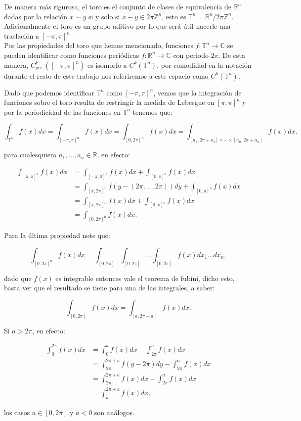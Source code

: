 \documentclass[12pt]{article}
\newcommand\R{\ensuremath{\mathbb{R}}}
\newcommand\T{\mathbb{T}}
\begin{document}
De manera más rigurosa, el toro es el conjunto de clases de equivalencia de $\mathbb{R}^n$ dadas por la relación $x \sim y$ si y solo si $x-y \in 2 \pi \mathbb{Z}^n$, esto es $\mathbb{T}^n=\mathbb{R}^n/ 2 \pi \mathbb{Z}^n$. Adicionalmente el toro es un grupo aditivo por lo que será útil hacerle una traslación a $[-\pi,\pi]^n$\\

Por las propiedades del toro que hemos mencionado, funciones $f: \mathbb{T}^n \rightarrow \mathbb{C}$ se pueden identificar como funciones periódicas $f: \mathbb{R}^n \rightarrow \mathbb{C}$ con periodo $2 \pi$. De esta manera, $C_{\text {per }}^k([-\pi, \pi]^n)$ es isomorfo a $C^k(\mathbb{T}^n)$, por comodidad en la notación durante el resto de  este trabajo nos referiremos a este espacio como $C^k(\T^n)$. \cite{ogrianoc}\\

\begin{note}
    Dado que  podemos identificar $\mathbb{T}^n$ como $[-\pi,\pi]^n$, vemos que la integración de funciones sobre el toro resulta de restringir la medida de Lebesgue en $[\pi,\pi]^n$ y por la periodicidad de las funciones en $\mathbb{T}^n$ tenemos que:

    $$\int_{\mathbb{T}^n} f(x) d x=\int_{[-\pi,\pi]^n} f(x) d x=\int_{[0,2\pi]^n} f(x) d x=\int_{\left[a_1, 2\pi+a_1\right] \times \cdots \times\left[a_n, 2\pi+a_n\right]} f(x) d x.$$


    para cualesquiera $a_1,\ldots,a_n \in \R$, en efecto:

    $$\begin{aligned}
    \int_{[\pi, \pi]^n} f(x) d x & =\int_{[-\pi, 0]^n} f(x) d x+\int_{[0, \pi]^n} f(x) d x \\
     & =\int_{[\pi, 2 \pi]^n} f(y-(2 \pi,\ldots,2\pi)) d y+\int_{[0, \pi]^n} f(x) d x \\
    & =\int_{[\pi, 2 \pi]^n} f(x) d x+\int_{[0, \pi]^n} f(x) d x\\
    &=\int_{[0,2\pi]^n} f(x) d x.
    \end{aligned}$$

Para la última propiedad note que:

$$\int_{[0,2\pi]^ n}f(x)dx=\int_{[0,2\pi]}\int_{[0,2\pi]}\ldots\int_{[0,2\pi]}f(x) dx_1\ldots dx_n,$$

dado que $f(x)$ es integrable entonces vale el teorema de fubini, dicho esto, basta ver que el resultado se tiene para una de las integrales, a saber:

$$\int_{[0,2\pi]}f(x)dx=\int_{[a,2\pi+a]}f(x)dx.$$

Si $a>2\pi$, en efecto:

\begin{align*}
    \int_0^{2\pi}f(x)dx&=\int_0^af(x)dx-\int_{2\pi}^af(x) dx\\
    &=\int_{2\pi}^{2\pi+a}f(y-2\pi)dy-\int_{2\pi}^af(x)dx\\
    &=\int_{2\pi}^{2\pi+a}f(x)dx-\int_{2\pi}^af(x)dx\\
    &=\int_a^{2\pi+a}f(x)dx
,\end{align*}

los casos $a\in [0,2\pi]$ y $a<0$ son análogos.
\end{note}
\end{document}
